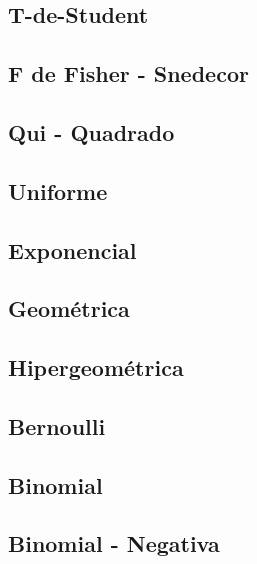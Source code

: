 \documentclass[
]{book}
\begin{document}
\hypertarget{t-de-student}{%
\subsection{T-de-Student}\label{t-de-student}}

\hypertarget{f-de-fisher---snedecor}{%
\subsection{F de Fisher - Snedecor}\label{f-de-fisher---snedecor}}

\hypertarget{qui---quadrado}{%
\subsection{Qui - Quadrado}\label{qui---quadrado}}

\hypertarget{uniforme}{%
\subsection{Uniforme}\label{uniforme}}

\hypertarget{exponencial}{%
\subsection{Exponencial}\label{exponencial}}

\hypertarget{geomuxe9trica}{%
\subsection{Geométrica}\label{geomuxe9trica}}

\hypertarget{hipergeomuxe9trica}{%
\subsection{Hipergeométrica}\label{hipergeomuxe9trica}}

\hypertarget{bernoulli}{%
\subsection{Bernoulli}\label{bernoulli}}

\hypertarget{binomial}{%
\subsection{Binomial}\label{binomial}}

\hypertarget{binomial---negativa}{%
\subsection{Binomial - Negativa}\label{binomial---negativa}}
\end{document}
